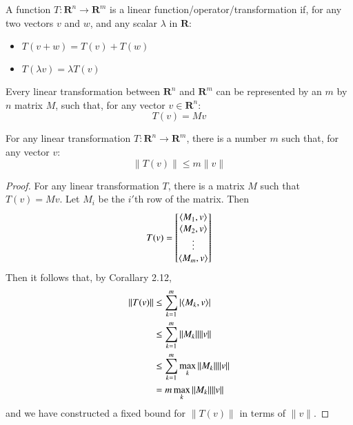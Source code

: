 \begin{definition}
  A function $T:\mathbf{R}^n \to \mathbf{R}^m$ is a linear function/operator/transformation if, for any two vectors $v$ and $w$, and any scalar $\lambda$ in $\mathbf{R}$:

  \begin{itemize}
    \item $T(v + w) = T(v) + T(w)$
    \item $T(\lambda v) = \lambda T(v)$
  \end{itemize}
\end{definition}

Every linear transformation between $\mathbf{R}^n$ and $\mathbf{R}^m$ can be represented by an $m$ by $n$ matrix $M$, such that, for any vector $v \in \mathbf{R}^n$:
%
\[ T(v) = Mv \]

\begin{lemma}
  For any linear transformation $T:\mathbf{R}^n \to \mathbf{R}^m$, there is a number $m$ such that, for any vector $v$:
  \[ \| T(v) \| \leq m \| v \| \]
\end{lemma}
\begin{proof}
  For any linear transformation $T$, there is a matrix $M$ such that $T(v) = Mv$. Let $M_i$ be the $i'$th row of the matrix. Then
  \[ T(v) = \begin{bmatrix} \langle M_1, v\rangle \\ \langle M_2, v\rangle \\ \vdots \\ \langle M_m, v\rangle \end{bmatrix} \]
  Then it follows that, by Corallary 2.12,
  \begin{align*}
    \| T(v) \| &\leq \sum_{k = 1}^m | \langle M_k, v\rangle |\\
               &\leq \sum_{k = 1}^m \| M_k \| \| v \|\\
               &\leq \sum_{k = 1}^m \max_{k} \| M_k \| \| v \|\\
               &= m \max_{k} \| M_k \| \| v \|
  \end{align*}
  and we have constructed a fixed bound for $\| T(v) \|$ in terms of $\| v \|$.
\end{proof}

